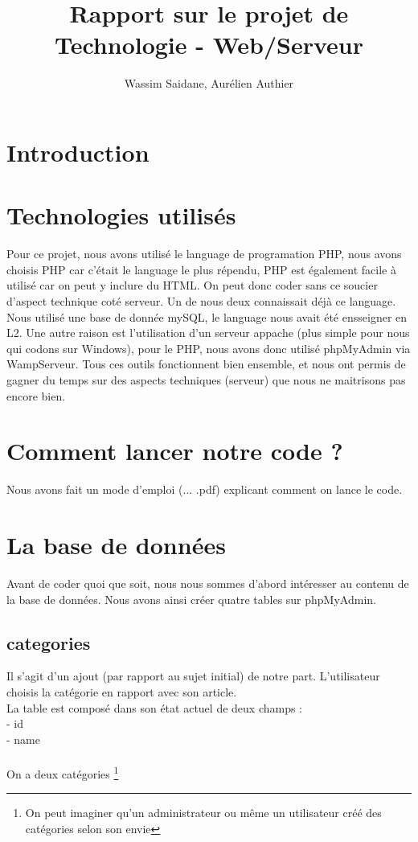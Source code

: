 \documentclass{article}
\title{Rapport sur le projet de Technologie - Web/Serveur}
\author{Wassim Saidane, Aurélien Authier}
\date{}
\begin{document}
    \maketitle
    \tableofcontents
    \newpage
    \section*{Introduction}
    \section{Technologies utilisés}
    Pour ce projet, nous avons utilisé le language de programation PHP, 
    nous avons choisis PHP car c'était le language le plus répendu,
    PHP est également facile à utilisé car on peut y inclure du HTML. On peut
    donc coder sans ce soucier d'aspect technique coté serveur. Un de nous deux 
    connaissait déjà ce language. \\
    Nous utilisé une base de donnée mySQL, le language nous avait été ensseigner en L2.
    Une autre raison est l'utilisation d'un serveur appache (plus simple pour nous qui codons sur Windows),
    pour le PHP, nous avons donc utilisé phpMyAdmin via WampServeur. Tous ces outils fonctionnent bien ensemble,
    et nous ont permis de gagner du temps sur des aspects techniques (serveur) que nous ne maitrisons pas encore bien.

    \section{Comment lancer notre code ?}
    Nous avons fait un mode d'emploi (... .pdf) explicant comment on lance le code.
    \section{La base de données}
    Avant de coder quoi que soit, nous nous sommes d'abord intéresser au contenu de la base de données.
    Nous avons ainsi créer quatre tables sur phpMyAdmin.
    \subsection{categories}
    Il s'agit d'un ajout (par rapport au sujet initial) de notre part. 
    L'utilisateur choisis la catégorie en rapport avec son article. \\
    La table est composé dans son état actuel de deux champs : \\
    - id \\
    - name \\
    \\
    On a deux catégories \footnote{On peut imaginer qu'un administrateur ou même un utilisateur créé des catégories selon son envie}
    \newpage
\end{document}
